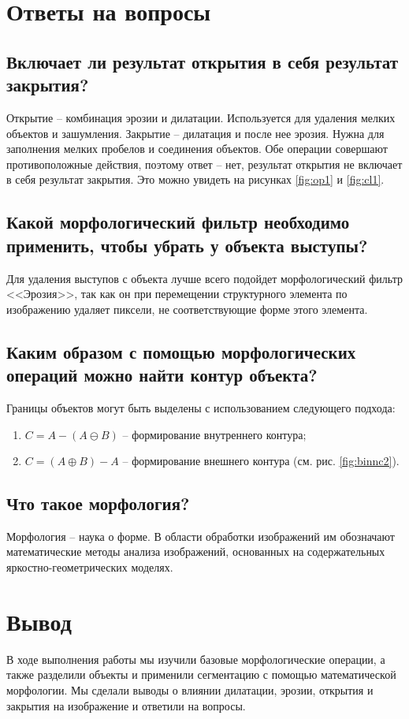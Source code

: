 \documentclass[a4paper, 12pt]{article}
\begin{document}
    \section{Ответы на вопросы}
    \subsection{Включает ли результат открытия в себя результат закрытия?}
    Открытие -- комбинация эрозии и дилатации. Используется для удаления мелких объектов
    и зашумления. Закрытие -- дилатация и после нее эрозия. Нужна для заполнения мелких
    пробелов и соединения объектов. Обе операции совершают противоположные действия, поэтому
    ответ -- нет, результат открытия не включает в себя результат закрытия. Это можно увидеть
    на рисунках \ref{fig:op1} и \ref{fig:cl1}.


    \subsection{Какой морфологический фильтр необходимо применить, чтобы убрать у объекта выступы?}
    Для удаления выступов с объекта лучше всего подойдет морфологический фильтр <<Эрозия>>, так как
    он при перемещении структурного элемента по изображению удаляет пиксели, не соответствующие
    форме этого элемента.


    \subsection{Каким образом с помощью морфологических операций можно найти контур объекта?}
    Границы объектов могут быть выделены с использованием следующего подхода:
    \begin{enumerate}
        \item $C=A-(A\ominus B)$ -- формирование внутреннего контура;
        \item $C=(A\oplus B)-A$ -- формирование внешнего контура (см. рис. \ref{fig:binnc2}).
    \end{enumerate}


    \subsection{Что такое морфология?}
    Морфология -- наука о форме. В области обработки изображений им обозначают
    математические методы анализа изображений, основанных на
    содержательных яркостно-геометрических моделях.


    \section{Вывод}
    В ходе выполнения работы мы изучили базовые морфологические операции, а также разделили объекты
    и применили сегментацию с помощью математической морфологии. Мы сделали выводы о влиянии дилатации,
    эрозии, открытия и закрытия на изображение и ответили на вопросы.
\end{document}
